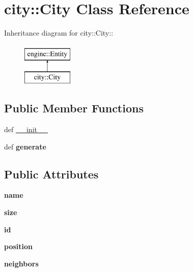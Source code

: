 \hypertarget{classcity_1_1City}{
\section{city::City Class Reference}
\label{classcity_1_1City}
}
Inheritance diagram for city::City::\begin{figure}[H]
\begin{center}
\leavevmode
\includegraphics[height=2cm]{classcity_1_1City}
\end{center}
\end{figure}
\subsection*{Public Member Functions}
\begin{DoxyCompactItemize}
\item 
def \hyperlink{classcity_1_1City_af66d86e522c54c232f0ee7e7df63e82e}{\_\-\_\-init\_\-\_\-}
\item 
\hypertarget{classcity_1_1City_a9d6ea46a76bf0b19a52c8c9b1e1bf392}{
def {\bfseries generate}}
\label{classcity_1_1City_a9d6ea46a76bf0b19a52c8c9b1e1bf392}

\end{DoxyCompactItemize}
\subsection*{Public Attributes}
\begin{DoxyCompactItemize}
\item 
\hypertarget{classcity_1_1City_a6fe4953ed866f39ff28f9772846fca1e}{
{\bfseries name}}
\label{classcity_1_1City_a6fe4953ed866f39ff28f9772846fca1e}

\item 
\hypertarget{classcity_1_1City_ab9f83339e37095ab039310767c519af1}{
{\bfseries size}}
\label{classcity_1_1City_ab9f83339e37095ab039310767c519af1}

\item 
\hypertarget{classcity_1_1City_accc3327248bab8927ecd0792486f9845}{
{\bfseries id}}
\label{classcity_1_1City_accc3327248bab8927ecd0792486f9845}

\item 
\hypertarget{classcity_1_1City_ae5abf3124a6aef59e90276493b5d830c}{
{\bfseries position}}
\label{classcity_1_1City_ae5abf3124a6aef59e90276493b5d830c}

\item 
\hypertarget{classcity_1_1City_af253a073b93aab945e8751c1c5711d91}{
{\bfseries neighbors}}
\label{classcity_1_1City_af253a073b93aab945e8751c1c5711d91}

\end{DoxyCompactItemize}


